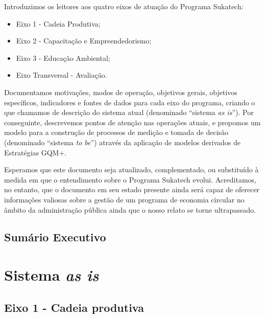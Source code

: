\documentclass[
	12pt,				%
	openright,			%
	twoside,			%
	a4paper,			%
	english,			%
	french,				%
	spanish,			%
	brazil,				%
	]{abntex2}
\begin{document}
Introduzimos os leitores aos quatro eixos de atuação do Programa Sukatech:

\begin{itemize}
  \item Eixo 1 - Cadeia Produtiva;
  \item Eixo 2 - Capacitação e Empreendedorismo;
  \item Eixo 3 - Educação Ambiental;
  \item Eixo Transversal - Avaliação.
\end{itemize}

Documentamos motivações, modos de operação, objetivos gerais, objetivos específicos, indicadores e fontes de dados para cada eixo do programa, criando o que chamamos de descrição do sistema atual (denominado ``sistema \textit{as is}''). Por conseguinte, descrevemos pontos de atenção nas operações atuais, e propomos um modelo para a construção de processos de medição e tomada de decisão (denominado ``sistema \textit{to be}'') através da aplicação de modelos derivados de Estratégias GQM+.

Esperamos que este documento seja atualizado, complementado, ou substituído à medida em que o entendimento sobre o Programa Sukatech evolui. Acreditamos, no entanto, que o documento em seu estado presente ainda será capaz de oferecer informações valiosas sobre a gestão de um programa de economia circular no âmbito da administração pública ainda que o nosso relato se torne ultrapassado.

\chapter*[Sumário Executivo]{Sumário Executivo}

\part{Sistema \textit{as is}}


\chapter{Eixo 1 - Cadeia produtiva}
\end{document}
